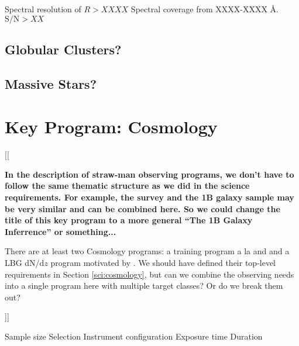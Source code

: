 \documentclass[11pt,a4paper,twoside,onecolumn,openany,final,oldfontcommands]{memoir}
\newcommand{\edit}[2][todo]{{\color{#1}[[{\bf #2}]]}}
\begin{document}
\begin{requirement}
\reqitem Spectral resolution of $R>XXXX$
\reqitem Spectral coverage from XXXX-XXXX \AA.
\reqitem $\text{S/N}>XX$

\end{requirement}

\section{Globular Clusters?}

\section{Massive Stars?}

\newpage



\chapter{Key Program: Cosmology}\label{prog:cosmology}

\edit{In the description of straw-man observing programs, we don't have to follow the same thematic structure as we did in the science requirements.  For example, the \photoz{} survey and the 1B galaxy sample may be very similar and can be combined here.  So we could change the title of this key program to a more general ``The 1B Galaxy Inferrence'' or something...

There are at least two Cosmology programs: a \photoz{} training program a la \citet{newman15} and \citet{hemmati18} and a LBG dN/d$z$ program motivated by \citet{wilson19}.  We should have defined their top-level requirements in Section \ref{sci:cosmology}, but can we combine the observing needs into a single program here with multiple target classes?  Or do we break them out?}


\begin{programrequirement}

\reqitem Sample size
\reqitem Selection 
\reqitem Instrument configuration 
\reqitem Exposure time
\reqitem Duration

\end{programrequirement}
\end{document}
